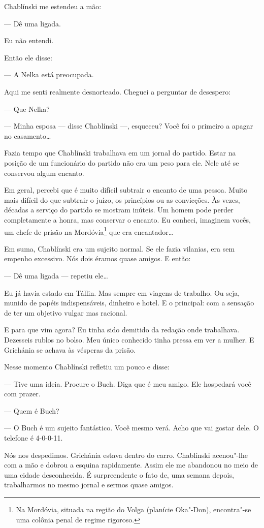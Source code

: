 Chablínski me estendeu a mão:

--- Dê uma ligada.

Eu não entendi.

Então ele disse:

--- A Nelka está preocupada.

Aqui me senti realmente desnorteado. Cheguei a perguntar de desespero:

--- Que Nelka?

--- Minha esposa --- disse Chablínski ---, esqueceu? Você foi o primeiro
a apagar no casamento\ldots{}

Fazia tempo que Chablínski trabalhava em um jornal do partido. Estar na
posição de um funcionário do partido não era um peso para ele. Nele até se conservou algum encanto.

Em geral, percebi que é muito difícil subtrair o encanto de uma pessoa.
Muito mais difícil do que subtrair o juízo, os princípios ou as
convicções. Às vezes, décadas a serviço do partido se mostram inúteis.
Um homem pode perder completamente a honra, mas conservar o encanto. Eu
conheci, imaginem vocês, um chefe de prisão na Mordóvia\footnote{Na
  Mordóvia, situada na região do Volga (planície Oka"-Don), encontra"-se
  uma colônia penal de regime rigoroso.} que era encantador\ldots{}

Em suma, Chablínski era um sujeito normal. Se ele fazia vilanias, era
sem empenho excessivo. Nós dois éramos quase amigos. E então:

--- Dê uma ligada --- repetiu ele\ldots{}

Eu já havia estado em Tállin. Mas sempre em viagens de trabalho. Ou
seja, munido de papéis indispensáveis, dinheiro e hotel. E o principal:
com a sensação de ter um objetivo vulgar mas racional.

E para que vim agora? Eu tinha sido demitido da redação onde trabalhava.
Dezesseis rublos no bolso. Meu único conhecido tinha pressa em ver a
mulher. E Grichánia se achava às vésperas da prisão.

Nesse momento Chablínski refletiu um pouco e disse:

--- Tive uma ideia. Procure o Buch. Diga que é meu amigo. Ele hospedará
você com prazer.

--- Quem é Buch?

--- O Buch é um sujeito fantástico. Você mesmo verá. Acho que vai gostar
dele. O telefone é 4-0-0-11.

Nós nos despedimos. Grichánia estava dentro do carro. Chablínski
acenou"-lhe com a mão e dobrou a esquina rapidamente. Assim ele me
abandonou no meio de uma cidade desconhecida. É surpreendente o fato de,
uma semana depois, trabalharmos no mesmo jornal e sermos quase amigos.

